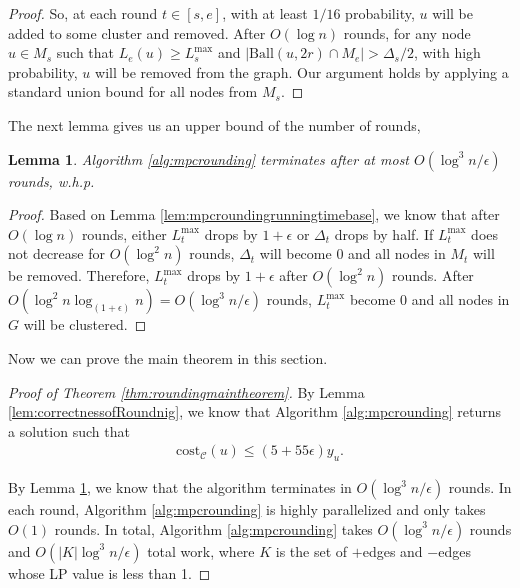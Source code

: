 \documentclass[11pt]{article}
\newcommand{\cost}{\mathrm{cost}}
\newtheorem{lemma}[theorem]{Lemma}
\newcommand{\calC}{{\mathcal{C}}}
\begin{document}
\begin{CJK*}{UTF8}{gbsn}
\begin{proof}
So, at each round $t \in [s, e]$, with at least $1/16$ probability, $u$ will be added to some cluster and removed. After $O(\log n)$ rounds, for any node $u \in M_s$ such that $L_e(u) \geq L^{\max}_s$ and $|\text{Ball}(u, 2r) \cap M_e| > \Delta_s / 2$, with high probability, $u$ will be removed from the graph. Our argument holds by applying a standard union bound for all nodes from $M_s$.
\end{proof}
The next lemma gives us an upper bound of the number of rounds,

\begin{lemma}
\label{lem:mpcroundingtimelogn}
Algorithm \ref{alg:mpcrounding} terminates after at most $O(\log^3 n / \epsilon)$ rounds, w.h.p.
\end{lemma}
\begin{proof}
Based on Lemma \ref{lem:mpcroundingrunningtimebase}, we know that after $O(\log n)$ rounds, either $L^{\max}_t$ drops by $1 + \epsilon$ or $\Delta_t$ drops by half. If $L^{\max}_t$ does not decrease for $O(\log^2 n)$ rounds,  $\Delta_t$ will become $0$ and all nodes in $M_t$ will be removed. Therefore, $L^{\max}_t$ drops by $1 + \epsilon$ after $O(\log^2 n)$ rounds. After $O(\log^2 n \log_{(1+\epsilon)}n) = O(\log^3 n /\epsilon)$ rounds,  $L^{\max}_t$ become $0$ and all nodes in $G$ will be clustered.
\end{proof}

Now we can prove the main theorem in this section.

\begin{proof}[Proof of Theorem \ref{thm:roundingmaintheorem}]
By Lemma \ref{lem:correctnessofRoundnig}, we know that Algorithm \ref{alg:mpcrounding} returns a solution such that 
\begin{align*}
    \cost_{\calC}(u) \leq (5 + 55\epsilon) y_u.
\end{align*}

By Lemma \ref{lem:mpcroundingtimelogn}, we know that the algorithm terminates in $O(\log^3 n /\epsilon)$ rounds. In each round, Algorithm \ref{alg:mpcrounding} is highly parallelized and only takes $O(1)$ rounds. In total, Algorithm \ref{alg:mpcrounding} takes $O(\log^3 n / \epsilon)$ rounds and $O( |K| \log^3 n /\epsilon)$ total work, where $K$ is the set of $+$edges and $-$edges whose LP value is less than 1.

\end{proof}






%
 

\end{CJK*}
\end{document}
